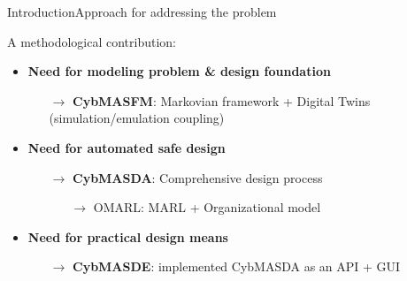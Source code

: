 \begin{frame}{Introduction}{Approach for addressing the problem}

    A methodological contribution:
    \begin{itemize}


        \item \textbf{Need for modeling problem \& design foundation}
              \begin{itemize}
                  \item[$\rightarrow$] \textbf{CybMASFM}: Markovian framework + Digital Twins (simulation/emulation coupling)
              \end{itemize}

        \item \textbf{Need for automated safe design}
              \begin{itemize}
                  \item[$\rightarrow$] \textbf{CybMASDA}: Comprehensive design process
                      \begin{itemize}
                          \item[$\rightarrow$] OMARL: MARL + Organizational model
                      \end{itemize}
              \end{itemize}

        \item \textbf{Need for practical design means}
              \begin{itemize}
                  \item[$\rightarrow$] \textbf{CybMASDE}: implemented CybMASDA as an API + GUI
              \end{itemize}

    \end{itemize}

    \ \\
    \begin{itemize}


\end{itemize}
\end{frame}
